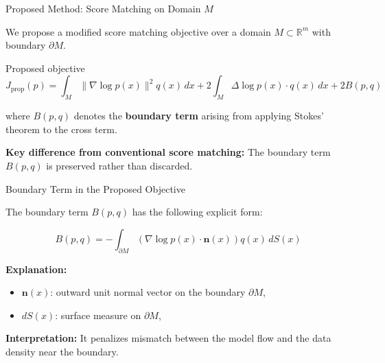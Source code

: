 \documentclass[aspectratio=169]{beamer}
\begin{document}
\begin{frame}{Proposed Method: Score Matching on Domain \( M \)}

We propose a modified score matching objective over a domain \( M \subset \mathbb{R}^m \) with boundary \( \partial M \).

\vspace{1em}
\begin{block}{Proposed objective}
\[
J_{\text{prop}}(p) = \int_M \|\nabla \log p(x)\|^2 q(x)\, dx
+ 2 \int_M \Delta \log p(x) \cdot q(x)\, dx
+ 2 B(p, q)
\]
\end{block}
where \( B(p, q) \) denotes the \textbf{boundary term} arising from applying Stokes' theorem to the cross term.

\vspace{1em}

\textbf{Key difference from conventional score matching:}  
The boundary term \( B(p, q) \) is preserved rather than discarded.

\end{frame}
\begin{frame}{Boundary Term in the Proposed Objective}

The boundary term \( B(p, q) \) has the following explicit form:

\[
B(p, q) = - \int_{\partial M} \left( \nabla \log p(x) \cdot \mathbf{n}(x) \right) q(x)\, dS(x)
\]

\vspace{1em}

\textbf{Explanation:}
\begin{itemize}
  \item \( \mathbf{n}(x) \): outward unit normal vector on the boundary \( \partial M \),
  \item \( dS(x) \): surface measure on \( \partial M \),
\end{itemize}

\vspace{1em}

\textbf{Interpretation:}  
It penalizes mismatch between the model flow and the data density near the boundary.

\end{frame}
\end{document}
